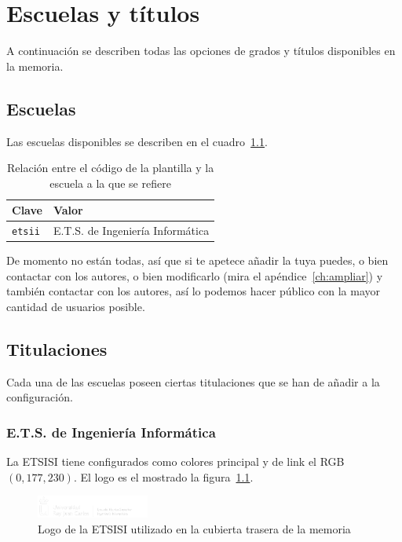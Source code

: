 \chapter{Escuelas y títulos}
\label{ch:escuelas-y-titulos}

A continuación se describen todas las opciones de grados y títulos disponibles en la memoria.

\section{Escuelas}

Las escuelas disponibles se describen en el cuadro~\ref{tbl:schools}.

\begin{table}[h]
    \centering
    \begin{tabularx}{\textwidth}{@{}lX@{}}
        \toprule
        \textbf{Clave}  & \textbf{Valor} \\
        \midrule
        \texttt{etsii} & E.T.S. de Ingeniería Informática \\
        \bottomrule
    \end{tabularx}
    \caption{\label{tbl:schools} Relación entre el código de la plantilla y la escuela a la que se refiere}
\end{table}

De momento no están todas, así que si te apetece añadir la tuya puedes, o bien contactar con los autores, o bien modificarlo (mira el apéndice~\ref{ch:ampliar}) y también contactar con los autores, así lo podemos hacer público con la mayor cantidad de usuarios posible.

\section{Titulaciones}

Cada una de las escuelas poseen ciertas titulaciones que se han de añadir a la configuración.


\subsection{E.T.S. de Ingeniería Informática}

La ETSISI tiene configurados como colores principal y de link el RGB $(0,177,230)$. El logo es el mostrado la figura~\ref{fig:logo-etsisi}.

\begin{figure}[h]
    \centering
    \includegraphics[width=10em]{upm-report/logos/logo-urjc-etsii.png}
    \caption{\label{fig:logo-etsisi}Logo de la ETSISI utilizado en la cubierta trasera de la memoria}
\end{figure}

